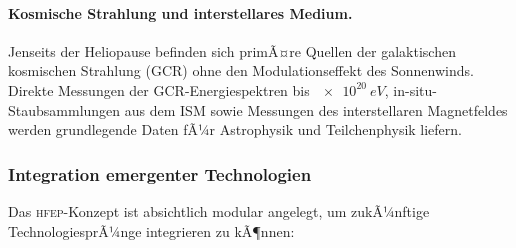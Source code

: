 ﻿\documentclass[a4paper,12pt,twoside]{article}
\theoremstyle{plain}
\theoremstyle{definition}
\theoremstyle{remark}
\newcommand{\HFEP}{\textsc{hfep}}
\begin{document}
	\paragraph{Kosmische Strahlung und interstellares Medium.}
	Jenseits der Heliopause befinden sich primÃ¤re Quellen der galaktischen
	kosmischen Strahlung (GCR) ohne den Modulationseffekt des Sonnenwinds.
	Direkte Messungen der GCR-Energiespektren bis $\SI{e20}{eV}$,
	in-situ-Staubsammlungen aus dem ISM sowie Messungen des interstellaren
	Magnetfeldes werden grundlegende Daten fÃ¼r Astrophysik und Teilchenphysik
	liefern.

	\subsubsection{Integration emergenter Technologien}

	Das \HFEP-Konzept ist absichtlich modular angelegt, um zukÃ¼nftige
	TechnologiesprÃ¼nge integrieren zu kÃ¶nnen:
\end{document}

